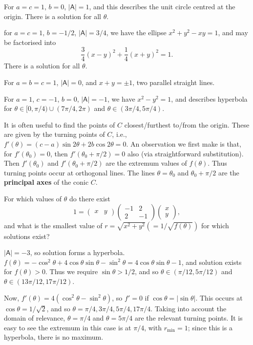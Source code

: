 \documentclass[letter-paper]{tufte-book}
\newenvironment{example}[1][Example]{\begin{trivlist}
\item[\hskip \labelsep {\bfseries #1}]}{\end{trivlist}}
\newcommand\Def[1]{\textbf{#1}}
\begin{document}
\begin{example}
	For $a=c=1$, $b=0$, $|\mathsf{A}|=1$, and this describes the unit circle
	centred at the origin. There is a solution for all $\theta$.
	
	for $a=c=1$, $b=-1/2$, $|\mathsf{A}|=3/4$, we have the ellipse $x^2 + y^2
	-xy = 1$, and may be factorised into
	\begin{equation*}
		\frac{3}{4}(x-y)^2 + \frac{1}{4}(x+y)^2 = 1.
	\end{equation*}
	There is a solution for all $\theta$.
	
	For $a=b=c=1$, $|\mathsf{A}|=0$, and $x+y=\pm1$, two parallel straight
	lines.
	
	For $a=1$, $c=-1$, $b=0$, $|\mathsf{A}|=-1$, we have $x^2 - y^2 = 1$, and
	describes hyperbola for $\theta\in[0,\pi/4)\cup(7\pi/4,2\pi)$ and
	$\theta\in(3\pi/4,5\pi/4)$.
\end{example}

It is often useful to find the points of $C$ closest/furthest to/from the
origin. These are given by the turning points of $C$, i.e.,
$f'(\theta)=(c-a)\sin2\theta+2b\cos2\theta=0$. An observation we first make is
that, for $f'(\theta_0)=0$, then $f'(\theta_0+\pi/2)=0$ also (via
straightforward substitution). Then $f'(\theta_0)$ and $f'(\theta_0 + \pi/2)$
are the extremum values of $f(\theta)$. Thus turning points occur at orthogonal
lines. The lines $\theta=\theta_0$ and $\theta_0+\pi/2$ are the
\Def{principal axes} of the conic $C$.
\begin{example}
	For which values of $\theta$ do there exist
	\begin{equation*}
		1=\begin{pmatrix}x & y\end{pmatrix}
		\begin{pmatrix}-1 & 2 \\ 2 & -1\end{pmatrix}
		\begin{pmatrix}x\\y\end{pmatrix},
	\end{equation*}
	and what is the smallest value of $r=\sqrt{x^2+y^2}(=1/\sqrt{f(\theta)})$
	for which solutions exist?
	
	$|\mathsf{A}|=-3$, so solution forms a hyperbola.
	$f(\theta)=-\cos^2\theta+4\cos\theta\sin\theta-\sin^2\theta
	=4\cos\theta\sin\theta-1$, and solution exists for $f(\theta)>0$. Thus we
	require $\sin\theta>1/2$, and so $\theta\in(\pi/12,5\pi/12)$ and
	$\theta\in(13\pi/12,17\pi/12)$.
	
	Now, $f'(\theta)=4(\cos^2\theta-\sin^2\theta)$, so $f'=0$ if
	$\cos\theta=|\sin\theta|$. This occurs at $\cos\theta=1/\sqrt{2}$, and so
	$\theta=\pi/4,3\pi/4,5\pi/4,17\pi/4$. Taking into account the domain of
	relevance, $\theta=\pi/4$ and $\theta=5\pi/4$ are the relevant turning
	points. It is easy to see the extremum in this case is at $\pi/4$, with
	$r_{\min}=1$; since this is a hyperbola, there is no maximum.
\end{example}
\end{document}
